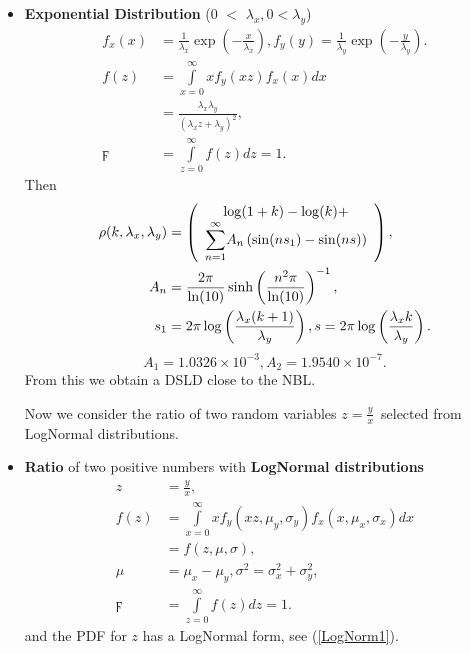 \documentclass[titlepage,fleqn]{article}%
\begin{document}
\begin{itemize}
\item \textbf{Exponential Distribution} ($0$%
$<$%
$\lambda_{x},0<\lambda_{y}$)%
\begin{align*}
f_{x}(x)  &  =\frac{1}{\lambda_{x}}\exp\left(  -\frac{x}{\lambda_{x}}\right)
,f_{y}(y)=\frac{1}{\lambda_{y}}\exp\left(  -\frac{y}{\lambda_{y}}\right)  .\\
f(z)  &  =%
{\displaystyle\int\limits_{x=0}^{\infty}}
xf_{y}(xz)f_{x}(x)dx\\
&  =\frac{\lambda_{x}\lambda_{y}}{\left(  \lambda_{x}z+\lambda_{y}\right)
^{2}},\\
\digamma &  =%
{\displaystyle\int\limits_{z=0}^{\infty}}
f(z)dz=1.
\end{align*}
Then%
\begin{align*}
\rho(k,\lambda_{x},\lambda_{y})  &  =\left(
\begin{array}
[c]{c}%
\log(1+k)-\log(k)+\\%
{\displaystyle\sum\limits_{n=1}^{\infty}}
A_{n}\left(  \sin(ns_{1}\right)  -\sin(ns))
\end{array}
\right)  ,\\
A_{n}  &  =\frac{2\pi}{\ln(10)}\sinh\left(  \frac{n^{2}\pi}{\ln(10)}\right)
^{-1},\\
s_{1}  &  =2\pi\log\left(  \frac{\lambda_{x}(k+1)}{\lambda_{y}}\right)
,s=2\pi\log\left(  \frac{\lambda_{x}k}{\lambda_{y}}\right)  .
\end{align*}%
\[
A_{1}=1.0326\times10^{-3},A_{2}=1.9540\times10^{-7}.
\]
From this we obtain a DSLD close to the NBL.

Now we consider the ratio of two random variables $z=\frac{y}{x}$\ selected
from LogNormal distributions.

\item \textbf{Ratio } of two positive numbers with \textbf{LogNormal
distributions}%
\begin{align*}
z  &  =\frac{y}{x},\\
f(z)  &  =%
{\displaystyle\int\limits_{x=0}^{\infty}}
xf_{y}(xz,\mu_{y},\sigma_{y})f_{x}(x,\mu_{x},\sigma_{x})dx\\
&  =f(z,\mu,\sigma),\\
\mu &  =\mu_{x}-\mu_{y},\sigma^{2}=\sigma_{x}^{2}+\sigma_{y}^{2},\\
\digamma &  =%
{\displaystyle\int\limits_{z=0}^{\infty}}
f(z)dz=1.
\end{align*}
and the PDF for $z$ has a LogNormal form, see (\ref{LogNorm1}).
\end{itemize}
\end{document}
